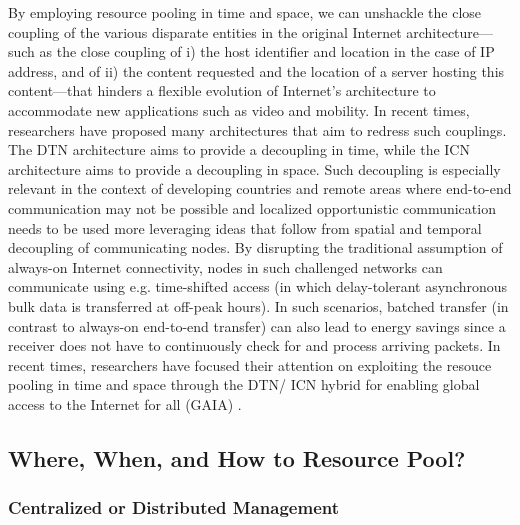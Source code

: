 \documentclass{sigcomm-alternate}
\begin{document}
By employing resource pooling in time and space, we can unshackle the close coupling of the various disparate entities in the original Internet architecture---such as the close coupling of i) the host identifier and location in the case of IP address, and of ii) the content requested and the location of a server hosting this content---that hinders a flexible evolution of Internet's architecture to accommodate new applications such as video and mobility. In recent times, researchers have proposed many architectures that aim to redress such couplings. The DTN architecture aims to provide a decoupling in time, while the ICN architecture aims to provide a decoupling in space. Such decoupling is especially relevant in the context of developing countries and remote areas where end-to-end communication may not be possible and localized opportunistic communication needs to be used more leveraging ideas that follow from spatial and temporal decoupling of communicating nodes. By disrupting the traditional assumption of always-on Internet connectivity, nodes in such challenged networks can communicate using e.g. time-shifted access (in which delay-tolerant asynchronous bulk data is transferred at off-peak hours). In such scenarios, batched transfer (in contrast to always-on end-to-end transfer) can also lead to energy savings since a receiver does not have to continuously check for and process arriving packets. In recent times, researchers have focused their attention on exploiting the resouce pooling in time and space through the DTN/ ICN hybrid for enabling global access to the Internet for all (GAIA) \cite{trossen2016towards}. 




















\subsection{Where, When, and How to Resource Pool?}

\vspace{1mm}
\subsubsection{Centralized or Distributed Management}
\end{document}

